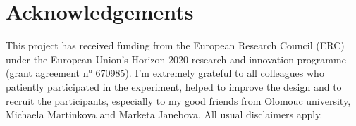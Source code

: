 \documentclass[output=paper]{langsci/langscibook}
\begin{document}
\section*{Acknowledgements}

This project has received funding from the European Research Council (ERC) under the European Union's Horizon 2020 research and innovation programme (grant agreement n° 670985). I’m extremely grateful to all colleagues who patiently participated in the experiment, helped to improve the design and to recruit the participants, especially to my good friends from Olomouc university, Michaela Martinkova and Marketa Janebova. All usual disclaimers apply.

\sloppy
\printbibliography[heading=subbibliography,notkeyword=this] 
\end{document}
